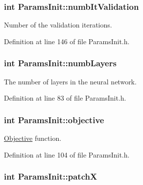 \subsubsection[{\texorpdfstring{numb\+It\+Validation}{numbItValidation}}]{\setlength{\rightskip}{0pt plus 5cm}int Params\+Init\+::numb\+It\+Validation}\hypertarget{classParamsInit_a4d892718b54db6189abe285406e49972}{}\label{classParamsInit_a4d892718b54db6189abe285406e49972}


Number of the validation iterations. 



Definition at line 146 of file Params\+Init.\+h.

\subsubsection[{\texorpdfstring{numb\+Layers}{numbLayers}}]{\setlength{\rightskip}{0pt plus 5cm}int Params\+Init\+::numb\+Layers}\hypertarget{classParamsInit_a290d2b18df1f4b1ceba37d2882ad2338}{}\label{classParamsInit_a290d2b18df1f4b1ceba37d2882ad2338}


The number of layers in the neural network. 



Definition at line 83 of file Params\+Init.\+h.

\subsubsection[{\texorpdfstring{objective}{objective}}]{\setlength{\rightskip}{0pt plus 5cm}int Params\+Init\+::objective}\hypertarget{classParamsInit_ad21a67901ba8054119cf4bb79c9ac643}{}\label{classParamsInit_ad21a67901ba8054119cf4bb79c9ac643}


\hyperlink{classObjective}{Objective} function. 



Definition at line 104 of file Params\+Init.\+h.

\subsubsection[{\texorpdfstring{patchX}{patchX}}]{\setlength{\rightskip}{0pt plus 5cm}int Params\+Init\+::patchX}\hypertarget{classParamsInit_affe0ae5142a7411e07e526f967072e68}{}\label{classParamsInit_affe0ae5142a7411e07e526f967072e68}


